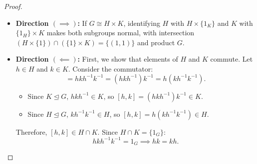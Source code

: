 \begin{proof}
\begin{itemize}[leftmargin=1.5em, itemsep=6pt]
    \item \textbf{Direction $(\implies)$:} If $G \cong H \times K$, identifying $H$ with $H \times \{1_K\}$ and $K$ with $\{1_H\} \times K$ makes both subgroups normal, with intersection $(H \times \{1\}) \cap (\{1\} \times K) = \{(1, 1)\}$ and product $G$.
    
    \item \textbf{Direction $(\impliedby)$:} 
    First, we show that elements of $H$ and $K$ commute.
    Let $h \in H$ and $k \in K$. Consider the commutator:
    \begin{equation*}
    [h, k] = h k h^{-1} k^{-1} = (h k h^{-1}) k^{-1} = h (k h^{-1} k^{-1}).
    \end{equation*}
    \begin{itemize}[leftmargin=1.5em, itemsep=3pt]
        \item Since $K \trianglelefteq G$, $h k h^{-1} \in K$, so $[h, k] = (h k h^{-1}) k^{-1} \in K$.
        \item Since $H \trianglelefteq G$, $k h^{-1} k^{-1} \in H$, so $[h, k] = h (k h^{-1} k^{-1}) \in H$.
    \end{itemize}
    Therefore, $[h, k] \in H \cap K$. Since $H \cap K = \{ 1_G \}$:
    \begin{equation*}
    h k h^{-1} k^{-1} = 1_G \implies hk = kh.
    \end{equation*}


\end{itemize}
\end{proof}
